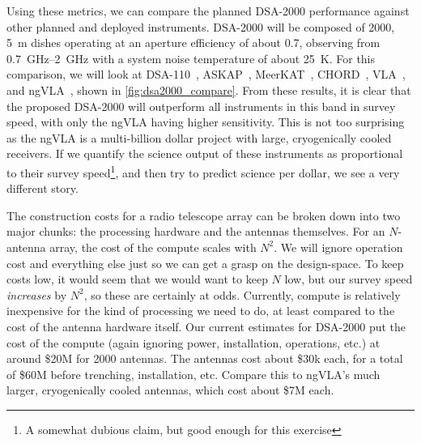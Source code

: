 Using these metrics, we can compare the planned DSA-2000 performance against other planned and deployed instruments.
DSA-2000 will be composed of 2000, \qty{5}{\m} dishes operating at an aperture efficiency of about \num{0.7}, observing from \SIrange{0.7}{2}{\GHz} with a system noise temperature of about \qty{25}{\K}.
For this comparison, we will look at DSA-110~\cite{raviDSA110OverviewFirst2023}, ASKAP~\cite{hotanAustralianSquareKilometre2021}, MeerKAT~\cite{jonasMeerKATRadioTelescope2018a}, CHORD~\cite{vanderlindeCanadianHydrogenObservatory2019}, 
VLA~\cite{VLAObservationalStatus}, and ngVLA~\cite{NgVLAPerformanceEstimates}, shown in \autoref{fig:dsa2000_compare}.
From these results, it is clear that the proposed DSA-2000 will outperform all instruments in this band in survey speed, with only the ngVLA having higher sensitivity.
This is not too surprising as the ngVLA is a multi-billion dollar project with large, cryogenically cooled receivers.
If we quantify the science output of these instruments as proportional to their survey speed\footnote{A somewhat dubious claim, but good enough for this exercise}, and then try to predict science per dollar, we see a very different story.

The construction costs for a radio telescope array can be broken down into two major chunks: the processing hardware and the antennas themselves.
For an $N$-antenna array, the cost of the compute scales with $N^2$.
We will ignore operation cost and everything else just so we can get a grasp on the design-space.
To keep costs low, it would seem that we would want to keep $N$ low, but our survey speed \textit{increases} by $N^2$, so these are certainly at odds.
Currently, compute is relatively inexpensive for the kind of processing we need to do, at least compared to the cost of the antenna hardware itself.
Our current estimates for DSA-2000 put the cost of the compute (again ignoring power, installation, operations, etc.) at around \$20M for 2000 antennas.
The antennas cost about \$30k each, for a total of \$60M before trenching, installation, etc.
Compare this to  ngVLA's much larger, cryogenically cooled antennas, which cost about \$7M each.

%     


